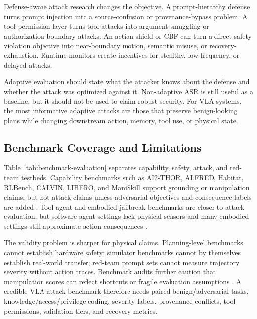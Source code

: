 Defense-aware attack research changes the objective. A prompt-hierarchy defense turns prompt injection into a source-confusion or provenance-bypass problem. A tool-permission layer turns tool attacks into argument-smuggling or authorization-boundary attacks. An action shield or CBF can turn a direct safety violation objective into near-boundary motion, semantic misuse, or recovery-exhaustion. Runtime monitors create incentives for stealthy, low-frequency, or delayed attacks.

Adaptive evaluation should state what the attacker knows about the defense and whether the attack was optimized against it. Non-adaptive ASR is still useful as a baseline, but it should not be used to claim robust security. For VLA systems, the most informative adaptive attacks are those that preserve benign-looking plans while changing downstream action, memory, tool use, or physical state.

\subsection{Benchmark Coverage and Limitations}



Table~\ref{tab:benchmark-evaluation} separates capability, safety, attack, and red-team testbeds. Capability benchmarks such as AI2-THOR, ALFRED, Habitat, RLBench, CALVIN, LIBERO, and ManiSkill support grounding or manipulation claims, but not attack claims unless adversarial objectives and consequence labels are added \cite{kolve2017ai2thor,shridhar2020alfred,savva2019habitat,james2020rlbench,mees2022calvin,liu2023libero,mu2021maniskill}. Tool-agent and embodied jailbreak benchmarks are closer to attack evaluation, but software-agent settings lack physical sensors and many embodied settings still approximate action consequences \cite{ruan2024toolemu,debenedetti2024agentdojo,zhan2024injecagent,yeke2026robojailbench}.

The validity problem is sharper for physical claims. Planning-level benchmarks cannot establish hardware safety; simulator benchmarks cannot by themselves establish real-world transfer; red-team prompt sets cannot measure trajectory severity without action traces. Benchmark audits further caution that manipulation scores can reflect shortcuts or fragile evaluation assumptions \cite{jiang2026benchmarkaudit}. A credible VLA attack benchmark therefore needs paired benign/adversarial tasks, knowledge/access/privilege coding, severity labels, provenance conflicts, tool permissions, validation tiers, and recovery metrics.
